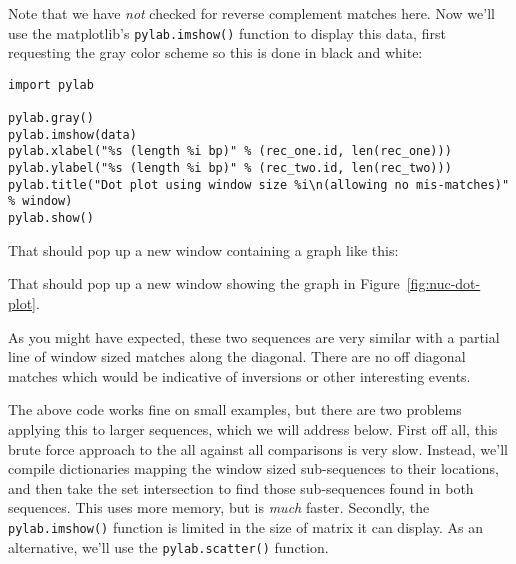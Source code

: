 Note that we have \emph{not} checked for reverse complement matches here.
Now we'll use the matplotlib's \verb|pylab.imshow()| function to display this
data, first requesting the gray color scheme so this is done in black and
white:

\begin{verbatim}
import pylab

pylab.gray()
pylab.imshow(data)
pylab.xlabel("%s (length %i bp)" % (rec_one.id, len(rec_one)))
pylab.ylabel("%s (length %i bp)" % (rec_two.id, len(rec_two)))
pylab.title("Dot plot using window size %i\n(allowing no mis-matches)" % window)
pylab.show()
\end{verbatim}

%
%
\begin{htmlonly}
\noindent That should pop up a new window containing a graph like this:


\end{htmlonly}
\begin{latexonly}
\noindent That should pop up a new window showing the graph in Figure~\ref{fig:nuc-dot-plot}.
\end{latexonly}
%
%
As you might have expected, these two sequences are very similar with a
partial line of window sized matches along the diagonal.  There are no off
diagonal matches which would be indicative of inversions or other interesting
events.

The above code works fine on small examples, but there are two problems
applying this to larger sequences, which we will address below.
First off all, this brute force approach to the all against all comparisons
is very slow.  Instead, we'll compile dictionaries mapping the window sized
sub-sequences to their locations, and then take the set intersection to find
those sub-sequences found in both sequences. This uses more memory, but is
\emph{much} faster.  Secondly, the \verb|pylab.imshow()| function is limited
in the size of matrix it can display.  As an alternative, we'll use the
\verb|pylab.scatter()| function.

